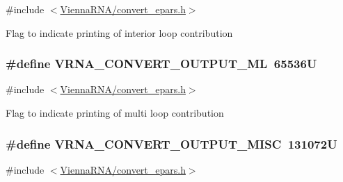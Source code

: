 {\ttfamily \#include $<$\hyperlink{convert__epars_8h}{Vienna\+R\+N\+A/convert\+\_\+epars.\+h}$>$}

Flag to indicate printing of interior loop contribution 
\subsubsection[{\texorpdfstring{V\+R\+N\+A\+\_\+\+C\+O\+N\+V\+E\+R\+T\+\_\+\+O\+U\+T\+P\+U\+T\+\_\+\+ML}{VRNA_CONVERT_OUTPUT_ML}}]{\setlength{\rightskip}{0pt plus 5cm}\#define V\+R\+N\+A\+\_\+\+C\+O\+N\+V\+E\+R\+T\+\_\+\+O\+U\+T\+P\+U\+T\+\_\+\+ML~65536U}\hypertarget{group__energy__parameters__convert_gaf2c8755d64eff3852aa45df9ac80a4fe}{}\label{group__energy__parameters__convert_gaf2c8755d64eff3852aa45df9ac80a4fe}


{\ttfamily \#include $<$\hyperlink{convert__epars_8h}{Vienna\+R\+N\+A/convert\+\_\+epars.\+h}$>$}

Flag to indicate printing of multi loop contribution 
\subsubsection[{\texorpdfstring{V\+R\+N\+A\+\_\+\+C\+O\+N\+V\+E\+R\+T\+\_\+\+O\+U\+T\+P\+U\+T\+\_\+\+M\+I\+SC}{VRNA_CONVERT_OUTPUT_MISC}}]{\setlength{\rightskip}{0pt plus 5cm}\#define V\+R\+N\+A\+\_\+\+C\+O\+N\+V\+E\+R\+T\+\_\+\+O\+U\+T\+P\+U\+T\+\_\+\+M\+I\+SC~131072U}\hypertarget{group__energy__parameters__convert_ga46d5b1535ae86060b6317565b7c6b40b}{}\label{group__energy__parameters__convert_ga46d5b1535ae86060b6317565b7c6b40b}


{\ttfamily \#include $<$\hyperlink{convert__epars_8h}{Vienna\+R\+N\+A/convert\+\_\+epars.\+h}$>$}

